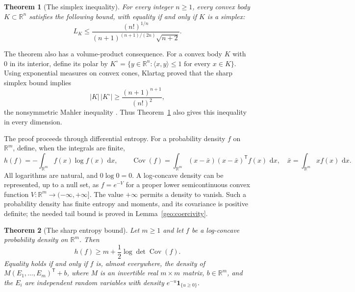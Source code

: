 \documentclass[11pt]{article}
\newtheorem{theorem}{Theorem}[section]
\theoremstyle{definition}
\theoremstyle{remark}
\numberwithin{equation}{section}
\begin{document}
\begin{theorem}[The simplex inequality]\label{intro:simplex}
For every integer $n\ge1$, every convex body $K\subset\mathbb R^n$ satisfies
the following bound, with equality if and only if $K$ is a simplex:
\begin{equation}\label{intro:simplex-bound}
 L_K\le
 \frac{(n!)^{1/n}}{(n+1)^{(n+1)/(2n)}\sqrt{n+2}}.
\end{equation}
\end{theorem}

The theorem also has a volume-product consequence.  For a convex body
$K$ with $0$ in its interior, define its polar by
$K^\circ=\{y\in\mathbb R^n:\langle x,y\rangle\le1\text{ for every }x\in K\}$.
Using exponential measures on convex cones, Klartag proved that the
sharp simplex bound implies
\begin{equation}\label{intro:mahler}
 |K|\,|K^\circ|\ge\frac{(n+1)^{n+1}}{(n!)^2},
\end{equation}
the nonsymmetric Mahler inequality
\cite[Corollary~1.2]{Klartag2018}.  Thus Theorem~\ref{intro:simplex}
also gives this inequality in every dimension.

The proof proceeds through differential entropy.  For a probability
density $f$ on $\mathbb R^m$, define, when the integrals are finite,
\[
 h(f)=-\int_{\mathbb R^m}f(x)\log f(x)\,\,\mathrm d x,
 \qquad
 \operatorname{Cov}(f)=\int_{\mathbb R^m}(x-\bar x)(x-\bar x)^{\mathsf T}f(x)\,\,\mathrm d x,
 \quad \bar x=\int_{\mathbb R^m}xf(x)\,\,\mathrm d x.
\]
All logarithms are natural, and $0\log0=0$.  A log-concave density can
be represented, up to a null set, as $f=e^{-V}$ for a proper lower
semicontinuous convex function $V:\mathbb R^m\to(-\infty,+\infty]$.
The value $+\infty$ permits a density to vanish.  Such a probability
density has finite entropy and moments, and its covariance is positive
definite; the needed tail bound is proved in Lemma~\ref{geo:coercivity}.

\begin{theorem}[The sharp entropy bound]\label{intro:entropy}
Let $m\ge1$ and let $f$ be a log-concave probability density on $\mathbb R^m$.
Then
\begin{equation}\label{intro:entropy-bound}
 h(f)\ge m+\frac12\log\det\operatorname{Cov}(f).
\end{equation}
Equality holds if and only if $f$ is, almost everywhere, the density
of $M(E_1,\ldots,E_m)^{\mathsf T}+b$, where $M$ is an invertible real
$m\times m$ matrix, $b\in\mathbb R^m$, and the $E_i$ are independent random
variables with density $e^{-u}\mathbf1_{\{u\ge0\}}$.
\end{theorem}
\end{document}
